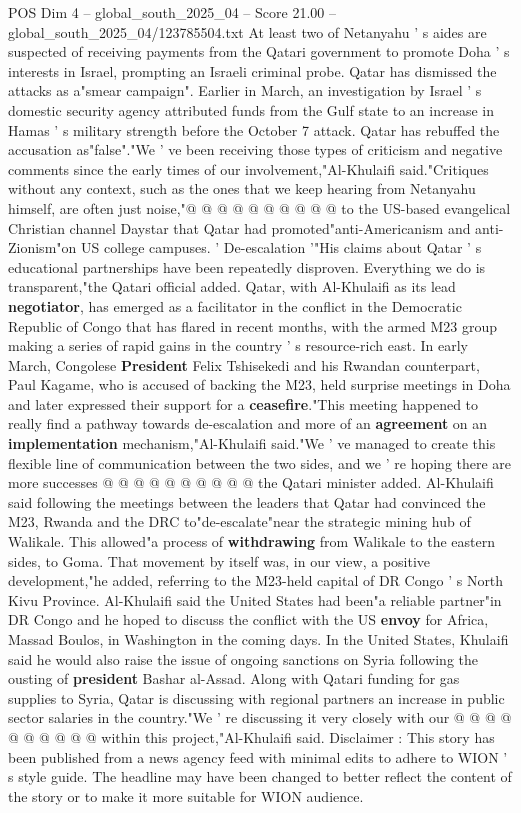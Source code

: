 \begin{textsample}{POS Dim 4 – global\_south\_2025\_04 – Score 21.00 – global\_south\_2025\_04/123785504.txt}
At least two of Netanyahu ' s aides are suspected of receiving payments from the Qatari government to promote Doha ' s interests in Israel, prompting an Israeli criminal probe.
Qatar has dismissed the attacks as a"smear campaign".
Earlier in March, an investigation by Israel ' s domestic security agency attributed funds from the Gulf state to an increase in Hamas ' s military strength before the October 7 attack.
Qatar has rebuffed the accusation as"false"."We ' ve been receiving those types of criticism and negative comments since the early times of our involvement,"Al-Khulaifi said."Critiques without any context, such as the ones that we keep hearing from Netanyahu himself, are often just noise,"@ @ @ @ @ @ @ @ @ @ to the US-based evangelical Christian channel Daystar that Qatar had promoted"anti-Americanism and anti-Zionism"on US college campuses. ' De-escalation '"His claims about Qatar ' s educational partnerships have been repeatedly disproven.
Everything we do is transparent,"the Qatari official added.
Qatar, with Al-Khulaifi as its lead \textbf{negotiator}, has emerged as a facilitator in the conflict in the Democratic Republic of Congo that has flared in recent months, with the armed M23 group making a series of rapid gains in the country ' s resource-rich east.
In early March, Congolese \textbf{President} Felix Tshisekedi and his Rwandan counterpart, Paul Kagame, who is accused of backing the M23, held surprise meetings in Doha and later expressed their support for a \textbf{ceasefire}."This meeting happened to really find a pathway towards de-escalation and more of an \textbf{agreement} on an \textbf{implementation} mechanism,"Al-Khulaifi said."We ' ve managed to create this flexible line of communication between the two sides, and we ' re hoping there are more successes @ @ @ @ @ @ @ @ @ @ the Qatari minister added.
Al-Khulaifi said following the meetings between the leaders that Qatar had convinced the M23, Rwanda and the DRC to"de-escalate"near the strategic mining hub of Walikale.
This allowed"a process of \textbf{withdrawing} from Walikale to the eastern sides, to Goma.
That movement by itself was, in our view, a positive development,"he added, referring to the M23-held capital of DR Congo ' s North Kivu Province.
Al-Khulaifi said the United States had been"a reliable partner"in DR Congo and he hoped to discuss the conflict with the US \textbf{envoy} for Africa, Massad Boulos, in Washington in the coming days.
In the United States, Khulaifi said he would also raise the issue of ongoing sanctions on Syria following the ousting of \textbf{president} Bashar al-Assad.
Along with Qatari funding for gas supplies to Syria, Qatar is discussing with regional partners an increase in public sector salaries in the country."We ' re discussing it very closely with our @ @ @ @ @ @ @ @ @ @ within this project,"Al-Khulaifi said.
Disclaimer : This story has been published from a news agency feed with minimal edits to adhere to WION ' s style guide.
The headline may have been changed to better reflect the content of the story or to make it more suitable for WION audience.


\end{textsample}
